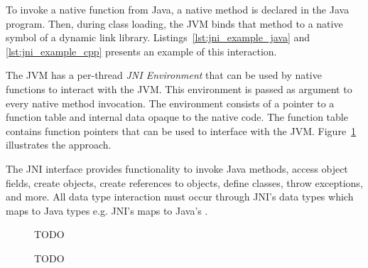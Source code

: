 To invoke a native function from Java, a native method is declared in the Java program. Then, during class loading, the JVM binds that method to a native symbol of a dynamic link library. Listings~\ref{lst:jni_example_java} and \ref{lst:jni_example_cpp} presents an example of this interaction.

\begin{figure}[b]
\par\noindent\begin{minipage}[t]{.45\textwidth}

\end{minipage}\hfill
\begin{minipage}[t]{.5\textwidth}

\end{minipage}
\caption*{} %
\end{figure}

The JVM has a per-thread \emph{JNI Environment} that can be used by native functions to interact with the JVM. This environment is passed as argument to every native method invocation. The environment consists of a pointer to a function table and internal data opaque to the native code. The function table contains function pointers that can be used to interface with the JVM. Figure~\ref{fig:jni_function_table} illustrates the approach.

The JNI interface provides functionality to invoke Java methods, access object fields, create objects, create references to objects, define classes, throw exceptions, and more. All data type interaction must occur through JNI's data types which maps to Java types e.g. JNI's  maps to Java's .

\begin{figure}[h]
\caption{TODO}
\label{fig:jni_function_table}
TODO
\end{figure}

